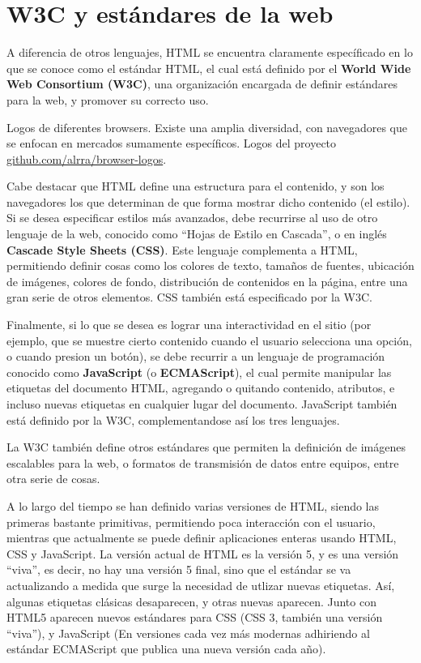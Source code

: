 \section{W3C y estándares de la web}

A diferencia de otros lenguajes, HTML se encuentra claramente específicado en lo
que se conoce como el estándar HTML, el cual está definido por el \textbf{World
Wide Web Consortium (W3C)}, una organización encargada de definir estándares para la web,
y promover su correcto uso.

{Logos de diferentes browsers. Existe una amplia diversidad, con navegadores que
se enfocan en mercados sumamente específicos.}
{Logos del proyecto \href{github.com/alrra/browser-logos}{github.com/alrra/browser-logos}.}

Cabe destacar que HTML define una estructura para el contenido, y son los navegadores
los que determinan de que forma mostrar dicho contenido (el estilo). Si se desea
especificar estilos más avanzados, debe recurrirse al uso de otro lenguaje de la
web, conocido como ``Hojas de Estilo en Cascada'', o en inglés \textbf{Cascade
Style Sheets (CSS)}. Este lenguaje complementa a HTML, permitiendo definir cosas
como los colores de texto, tamaños de fuentes, ubicación de imágenes, colores de
fondo, distribución de contenidos en la página, entre una gran serie de otros
elementos. CSS también está especificado por la W3C.

Finalmente, si lo que se desea es lograr una interactividad en el sitio (por ejemplo,
que se muestre cierto contenido cuando el usuario selecciona una opción, o cuando
presion un botón), se debe recurrir a un lenguaje de programación conocido como
\textbf{JavaScript} (o \textbf{ECMAScript}), el cual permite manipular las etiquetas
del documento HTML, agregando o quitando contenido, atributos, e incluso nuevas
etiquetas en cualquier lugar del documento. JavaScript también está definido por
la W3C, complementandose así los tres lenguajes.

La W3C también define otros estándares que permiten la definición de imágenes
escalables para la web, o formatos de transmisión de datos entre equipos, entre
otra serie de cosas.

A lo largo del tiempo se han definido varias versiones de HTML, siendo las primeras
bastante primitivas, permitiendo poca interacción con el usuario, mientras que
actualmente se puede definir aplicaciones enteras usando HTML, CSS y JavaScript.
La versión actual de HTML es la versión 5, y es una versión ``viva'', es decir,
no hay una versión 5 final, sino que el estándar se va actualizando a medida que
surge la necesidad de utlizar nuevas etiquetas. Así, algunas etiquetas clásicas
desaparecen, y otras nuevas aparecen. Junto con HTML5 aparecen nuevos estándares
para CSS (CSS 3, también una versión ``viva''), y JavaScript (En versiones cada
vez más modernas adhiriendo al estándar ECMAScript que publica una nueva versión
cada año).


